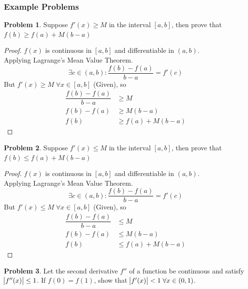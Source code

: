 \documentclass[14]{article}
\theoremstyle{definition}
\newtheorem{prob}{Problem}
\theoremstyle{case}
\begin{document}
\subsubsection{Example Problems}
\begin{prob}
Suppose $f'(x) \geq M$ in the interval $[a, b]$, then prove that $f(b) \geq f(a) + M(b - a)$
\end{prob}
\begin{proof}
$f(x)$ is continuous in $[a, b]$ and differentiable in $(a, b)$.\\
Applying Lagrange's Mean Value Theorem.
\[\exists c \in (a, b) : \dfrac{f(b) - f(a)}{b - a} = f'(c)\]
But $f'(x) \geq M \; \forall x \in [a, b]$ (Given), so\\
\begin{align*}
\dfrac{f(b) - f(a)}{b - a} &\geq M\\
f(b) - f(a) &\geq M (b - a)\\
f(b) &\geq f(a) + M (b - a)
\end{align*}
\end{proof}
\begin{prob}
Suppose $f'(x) \leq M$ in the interval $[a, b]$, then prove that $f(b) \leq f(a) + M(b - a)$
\end{prob}
\begin{proof}
$f(x)$ is continuous in $[a, b]$ and differentiable in $(a, b)$.\\
Applying Lagrange's Mean Value Theorem.
\[\exists c \in (a, b) : \dfrac{f(b) - f(a)}{b - a} = f'(c)\]
But $f'(x) \leq M \; \forall x \in [a, b]$ (Given), so\\
\begin{align*}
\dfrac{f(b) - f(a)}{b - a} &\leq M\\
f(b) - f(a) &\leq M (b - a)\\
f(b) &\leq f(a) + M (b - a)
\end{align*}
\end{proof}
\begin{prob}
Let the second derivative $f''$ of a function be continuous and satisfy $\abs{f''(x)} \leq 1$. If $f(0) = f(1)$, show that $\abs{f'(x)} < 1 \;\forall x \in (0, 1)$.
\end{prob}
\end{document}
